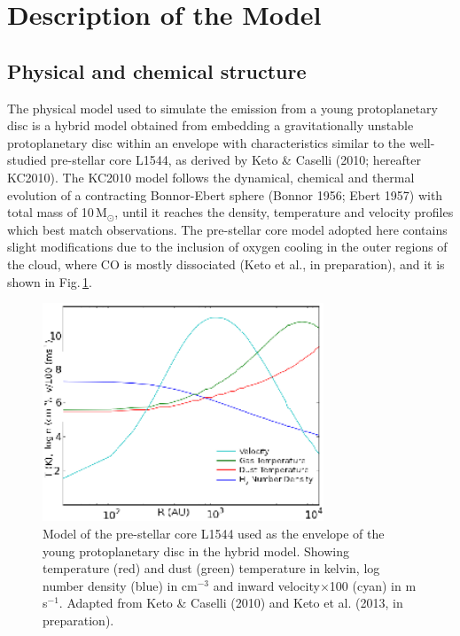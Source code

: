 \documentclass[useAMS,usenatbib]{mn2e}
\begin{document}
\section{Description of the Model} \label{sec:description_model}

\subsection{Physical and chemical structure} \label{subsec:physical_structure}


The physical model used to simulate the emission from a young protoplanetary disc is a hybrid model obtained from embedding a gravitationally unstable protoplanetary disc  within an envelope with characteristics similar to the well-studied pre-stellar core L1544, as derived by Keto \& Caselli (2010; hereafter KC2010). The KC2010 model follows the dynamical, chemical and thermal evolution of a contracting Bonnor-Ebert sphere (Bonnor 1956; Ebert 1957) with total mass of 10\,M$_{\odot}$, until it reaches the density, temperature and velocity profiles which best match observations. The pre-stellar core model adopted here contains slight modifications due to the inclusion of oxygen cooling in the outer regions of the cloud, where CO is mostly dissociated (Keto et al., in preparation), and it is shown in Fig.\,\ref{fig:l1544_model}. \newline

\begin{figure}
 \includegraphics[width=84mm]{Figures/model/L1544model_used_legend_small.eps}
 \caption{Model of the pre-stellar core L1544 used as the envelope of the young protoplanetary disc in the hybrid model. Showing temperature (red) and dust (green) temperature in kelvin, log number density (blue) in cm$^{-3}$ and inward velocity$\times$100 (cyan) in m$\,$s$^{-1}$. Adapted from Keto \& Caselli (2010) and Keto et al. (2013, in preparation).}
 \label{fig:l1544_model}
\end{figure}
\end{document}
